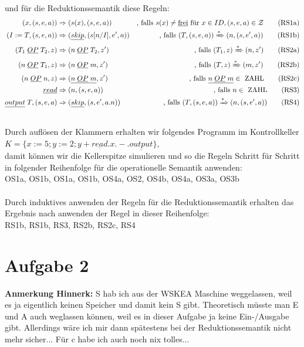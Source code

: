\documentclass[ngerman,a4paper]{report}
\begin{document}
und für die Reduktionssemantik diese Regeln:
\begin{align}
(x,(s,e,a)) &\Rightarrow (s(x), (s,e,a))&\text{, falls }s(x) \neq \text{\underline{frei}}\text{ für }x \in ID, (s,e,a) \in \mathcal{Z}\tag{RS1a}\\
(I:=T,(s,e,a)) &\Rightarrow (\underline{skip}, (s[n/I],e',a))&\text{, falls }(T, (s,e,a))\xRightarrow{*}(n,(s,e',a))\tag{RS1b}\\
(T_1\;\underline{OP}\;T_2, z) &\Rightarrow (n\;\underline{OP}\;T_2, z')&\text{, falls }(T_1, z) \xRightarrow{*}(n,z')\tag{RS2a}\\
(n\;\underline{OP}\;T_1, z) &\Rightarrow (n\;\underline{OP}\;m, z')&\text{, falls }(T, z) \xRightarrow{*}(m,z')\tag{RS2b}\\
(n\;\underline{OP}\;n, z) &\Rightarrow (\underline{n\;\underline{OP}\;m}, z')&\text{, falls }\underline{n\;\underline{OP}\;m} \in\text{ ZAHL}\tag{RS2c}\\
\underline{read} &\Rightarrow (n, (s,e,a))&\text{, falls } n \in\text{ ZAHL}\tag{RS3}\\
\underline{output}\;T, (s,e,a) &\Rightarrow (\underline{skip}, (s,e',a.n))&\text{, falls }(T, (s,e,a))\xRightarrow{*}(n,(s,e',a))\tag{RS4}\\\notag
\end{align}
Durch auflösen der Klammern erhalten wir folgendes Programm im Kontrollkeller\\
$K= \{x := 5; y := 2; y + \underline{read}.x.-.\underline{output}\}$,\\ damit können wir die Kellerspitze simulieren und so die Regeln Schritt für Schritt in folgender Reihenfolge für die operationelle Semantik anwenden:\\
OS1a, OS1b, OS1a, OS1b, OS4a, OS2, OS4b, OS4a, OS3a, OS3b\\
\\
Durch induktives anwenden der Regeln für die Reduktionssemantik erhalten das Ergebnis nach anwenden der Regel in dieser Reihenfolge:\\
RS1b, RS1b, RS3, RS2b, RS2c, RS4\\

\section*{Aufgabe 2}
\textbf{Anmerkung Hinnerk:} S hab ich aus der WSKEA Maschine weggelassen, weil es ja eigentlich keinen Speicher und damit kein S gibt. Theoretisch müsste man E und A auch weglassen können, weil es in dieser Aufgabe ja keine Ein-/Ausgabe gibt. Allerdings wäre ich mir dann spätestens bei der Reduktionssemantik nicht mehr sicher...
Für c habe ich auch noch nix tolles...
\end{document}
